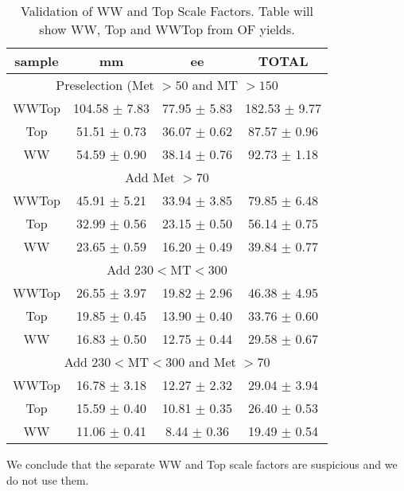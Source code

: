 \begin{table}[!ht]
\begin{center}
\small{
\begin{tabular}{c|c|c|c}
sample  & mm    & ee     & TOTAL\\ \hline 
\hline
\multicolumn{4}{c}{Preselection (Met $>50$ and MT $>150$} \\
\hline
\hline
WWTop   & 104.58 $\pm$ 7.83 & 77.95 $\pm$ 5.83  & 182.53 $\pm$ 9.77 \\ \hline 
Top     & 51.51 $\pm$ 0.73  & 36.07 $\pm$ 0.62  & 87.57 $\pm$ 0.96 \\ \hline 
WW      & 54.59 $\pm$ 0.90  & 38.14 $\pm$ 0.76  & 92.73 $\pm$ 1.18 \\ \hline 
\hline
\multicolumn{4}{c}{Add Met $>70$} \\
\hline
\hline 
WWTop   & 45.91 $\pm$ 5.21  & 33.94 $\pm$ 3.85  & 79.85 $\pm$ 6.48 \\ \hline 
Top     & 32.99 $\pm$ 0.56  & 23.15 $\pm$ 0.50  & 56.14 $\pm$ 0.75 \\ \hline 
WW      & 23.65 $\pm$ 0.59  & 16.20 $\pm$ 0.49  & 39.84 $\pm$ 0.77 \\ \hline 
\hline
\multicolumn{4}{c}{Add $230<$MT$<300$} \\
\hline
\hline 
WWTop   & 26.55 $\pm$ 3.97  & 19.82 $\pm$ 2.96  & 46.38 $\pm$ 4.95 \\ \hline 
Top     & 19.85 $\pm$ 0.45  & 13.90 $\pm$ 0.40  & 33.76 $\pm$ 0.60 \\ \hline 
WW      & 16.83 $\pm$ 0.50  & 12.75 $\pm$ 0.44  & 29.58 $\pm$ 0.67 \\ \hline 
\hline
\multicolumn{4}{c}{Add $230<$MT$<300$ and Met $>70$} \\
\hline
\hline 
WWTop   & 16.78 $\pm$ 3.18  & 12.27 $\pm$ 2.32  & 29.04 $\pm$ 3.94 \\ \hline 
Top     & 15.59 $\pm$ 0.40  & 10.81 $\pm$ 0.35  & 26.40 $\pm$ 0.53 \\ \hline 
WW      & 11.06 $\pm$ 0.41  & 8.44 $\pm$ 0.36   & 19.49 $\pm$ 0.54 \\ \hline 
\end{tabular}
\caption{Validation of WW and Top Scale Factors.  Table will show WW, Top and WWTop from OF yields.}
\label{tab:yield_presel_ofsfval}}
\end{center}
\end{table}

We conclude that the separate WW and Top scale factors are suspicious and we do not use them.

